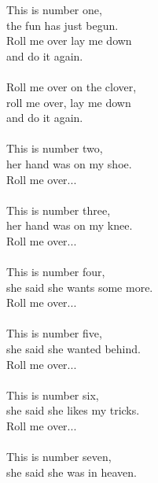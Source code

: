 
            This is number one, \\
            the fun has just begun. \\
            Roll me over lay me down \\
            and do it again. \\
\hspace{10mm} \\
            Roll me over on the clover, \\
            roll me over, lay me down \\
            and do it again. \\
\hspace{10mm} \\
            This is number two, \\
            her hand was on my shoe. \\
            Roll me over... \\
\hspace{10mm} \\
            This is number three, \\
            her hand was on my knee. \\
            Roll me over... \\
\hspace{10mm} \\
            This is number four, \\
            she said she wants some more. \\
            Roll me over... \\
\hspace{10mm} \\
            This is number five, \\
            she said she wanted behind. \\
            Roll me over... \\
\hspace{10mm} \\
            This is number six, \\
            she said she likes my tricks. \\
            Roll me over... \\
\hspace{10mm} \\
            This is number seven, \\
            she said she was in heaven. \\
